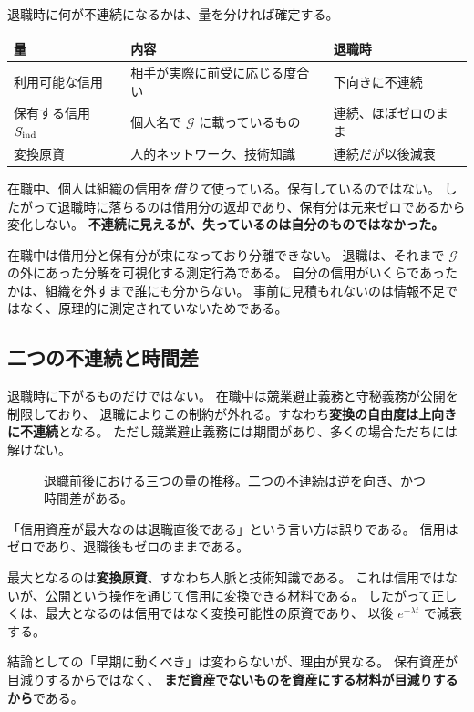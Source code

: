 退職時に何が不連続になるかは、量を分ければ確定する。

\begin{center}
\begin{tabularx}{\textwidth}{@{}lXl@{}}
\toprule
量 & 内容 & 退職時 \\
\midrule
利用可能な信用 & 相手が実際に前受に応じる度合い & 下向きに不連続 \\
保有する信用 $S_{\rm ind}$ & 個人名で $\mathcal{G}$ に載っているもの & 連続、ほぼゼロのまま \\
変換原資 & 人的ネットワーク、技術知識 & 連続だが以後減衰 \\
\bottomrule
\end{tabularx}
\label{tab:solo-credit-decomposition}
\end{center}

在職中、個人は組織の信用を\emph{借りて}使っている。保有しているのではない。
したがって退職時に落ちるのは借用分の返却であり、保有分は元来ゼロであるから変化しない。
\textbf{不連続に見えるが、失っているのは自分のものではなかった。}

\begin{remark}[退職は測定行為である]
在職中は借用分と保有分が束になっており分離できない。
退職は、それまで $\mathcal{G}$ の外にあった分解を可視化する測定行為である。
自分の信用がいくらであったかは、組織を外すまで誰にも分からない。
事前に見積もれないのは情報不足ではなく、原理的に測定されていないためである。
\end{remark}

\subsection{二つの不連続と時間差}

退職時に下がるものだけではない。
在職中は競業避止義務と守秘義務が公開を制限しており、
退職によりこの制約が外れる。すなわち\textbf{変換の自由度は上向きに不連続}となる。
ただし競業避止義務には期間があり、多くの場合ただちには解けない。

\begin{figure}[htbp]
\centering
{}
\caption{退職前後における三つの量の推移。二つの不連続は逆を向き、かつ時間差がある。}
\label{fig:credit-jump}
\end{figure}

\begin{remark}[最大となるのは信用ではない]
「信用資産が最大なのは退職直後である」という言い方は誤りである。
信用はゼロであり、退職後もゼロのままである。

最大となるのは\textbf{変換原資}、すなわち人脈と技術知識である。
これは信用ではないが、公開という操作を通じて信用に変換できる材料である。
したがって正しくは、最大となるのは信用ではなく変換可能性の原資であり、
以後 $e^{-\lambda t}$ で減衰する。

結論としての「早期に動くべき」は変わらないが、理由が異なる。
保有資産が目減りするからではなく、
\textbf{まだ資産でないものを資産にする材料が目減りするから}である。
\end{remark}

